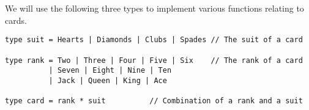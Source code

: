 We will use the following three types to implement various functions relating to cards.

\begin{lstlisting}
type suit = Hearts | Diamonds | Clubs | Spades // The suit of a card

type rank = Two | Three | Four | Five | Six    // The rank of a card
          | Seven | Eight | Nine | Ten
          | Jack | Queen | King | Ace

type card = rank * suit          // Combination of a rank and a suit
\end{lstlisting}
